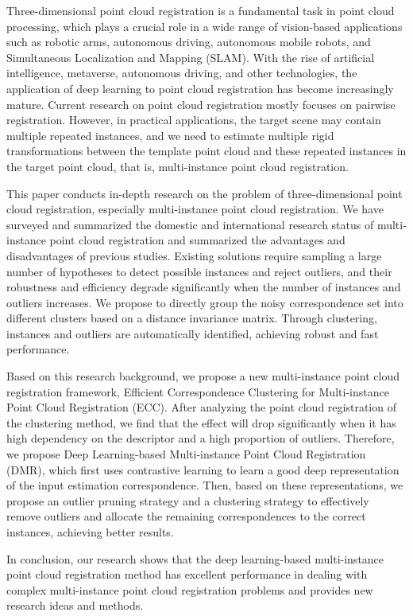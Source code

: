 Three-dimensional point cloud registration is a fundamental task in point cloud processing, which plays a crucial role in a wide range of vision-based applications such as robotic arms, autonomous driving, autonomous mobile robots, and Simultaneous Localization and Mapping (SLAM). With the rise of artificial intelligence, metaverse, autonomous driving, and other technologies, the application of deep learning to point cloud registration has become increasingly mature. Current research on point cloud registration mostly focuses on pairwise registration. However, in practical applications, the target scene may contain multiple repeated instances, and we need to estimate multiple rigid transformations between the template point cloud and these repeated instances in the target point cloud, that is, multi-instance point cloud registration.

    This paper conducts in-depth research on the problem of three-dimensional point cloud registration, especially multi-instance point cloud registration. We have surveyed and summarized the domestic and international research status of multi-instance point cloud registration and summarized the advantages and disadvantages of previous studies. Existing solutions require sampling a large number of hypotheses to detect possible instances and reject outliers, and their robustness and efficiency degrade significantly when the number of instances and outliers increases. We propose to directly group the noisy correspondence set into different clusters based on a distance invariance matrix. Through clustering, instances and outliers are automatically identified, achieving robust and fast performance.
    
    Based on this research background, we propose a new multi-instance point cloud registration framework, Efficient Correspondence Clustering for Multi-instance Point Cloud Registration (ECC). After analyzing the point cloud registration of the clustering method, we find that the effect will drop significantly when it has high dependency on the descriptor and a high proportion of outliers. Therefore, we propose Deep Learning-based Multi-instance Point Cloud Registration (DMR), which first uses contrastive learning to learn a good deep representation of the input estimation correspondence. Then, based on these representations, we propose an outlier pruning strategy and a clustering strategy to effectively remove outliers and allocate the remaining correspondences to the correct instances, achieving better results.
    
    In conclusion, our research shows that the deep learning-based multi-instance point cloud registration method has excellent performance in dealing with complex multi-instance point cloud registration problems and provides new research ideas and methods.